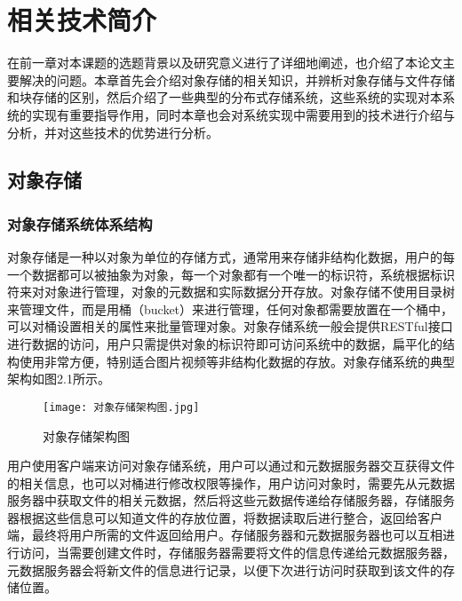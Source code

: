 
\chapter{相关技术简介}
在前一章对本课题的选题背景以及研究意义进行了详细地阐述，也介绍了本论文主要解决的问题。本章首先会介绍对象存储的相关知识，并辨析对象存储与文件存储和块存储的区别，然后介绍了一些典型的分布式存储系统，这些系统的实现对本系统的实现有重要指导作用，同时本章也会对系统实现中需要用到的技术进行介绍与分析，并对这些技术的优势进行分析。
\section{对象存储}%
\subsection{对象存储系统体系结构}%
对象存储是一种以对象为单位的存储方式，通常用来存储非结构化数据，用户的每一个数据都可以被抽象为对象，每一个对象都有一个唯一的标识符，系统根据标识符来对对象进行管理，对象的元数据和实际数据分开存放。对象存储不使用目录树来管理文件，而是用桶（bucket）来进行管理，任何对象都需要放置在一个桶中，可以对桶设置相关的属性来批量管理对象。对象存储系统一般会提供RESTful接口进行数据的访问，用户只需提供对象的标识符即可访问系统中的数据，扁平化的结构使用非常方便，特别适合图片视频等非结构化数据的存放。对象存储系统的典型架构如图2.1所示。
\begin{figure}
    \centering
    \texttt{[image: 对象存储架构图.jpg]}
    \caption{对象存储架构图}
\end{figure}

用户使用客户端来访问对象存储系统，用户可以通过和元数据服务器交互获得文件的相关信息，也可以对桶进行修改权限等操作，用户访问对象时，需要先从元数据服务器中获取文件的相关元数据，然后将这些元数据传递给存储服务器，存储服务器根据这些信息可以知道文件的存放位置，将数据读取后进行整合，返回给客户端，最终将用户所需的文件返回给用户。存储服务器和元数据服务器也可以互相进行访问，当需要创建文件时，存储服务器需要将文件的信息传递给元数据服务器，元数据服务器会将新文件的信息进行记录，以便下次进行访问时获取到该文件的存储位置。

